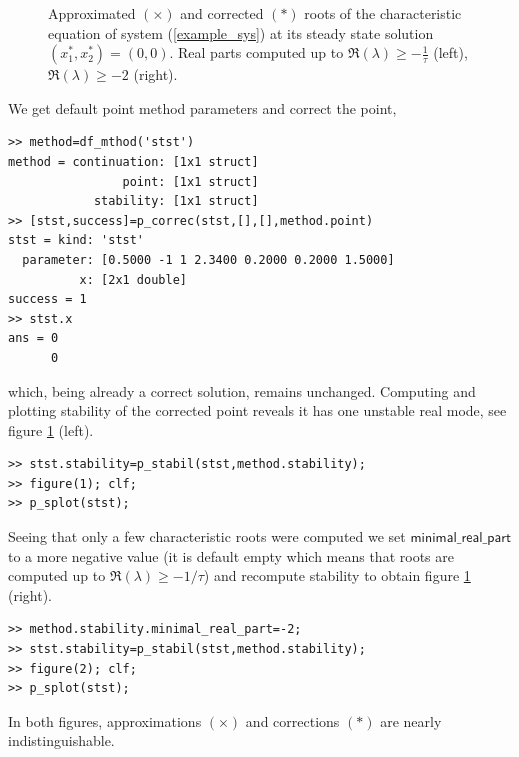 \documentclass[10pt]{article}
\gdef \parm#1{{\mathsf{#1}}}
\begin{document}
{\begin{figure}[h]
\begin{center}
\end{center}
\caption{\small\label{ride1+2_pic}Approximated $(\times)$
and corrected $(*)$ roots of the characteristic equation
of system (\ref{example_sys}) 
at its steady state solution $(x_1^*,x_2^*)=(0,0)$. 
Real parts computed up to $\Re(\lambda)\geq -\frac{1}{\tau}$
(left), $\Re(\lambda)\geq -2$ (right).} 
\end{figure}
We get default point method parameters and 
correct the point,
{\small\begin{verbatim}
>> method=df_mthod('stst')
method = continuation: [1x1 struct]
                point: [1x1 struct]
            stability: [1x1 struct]
>> [stst,success]=p_correc(stst,[],[],method.point)
stst = kind: 'stst'
  parameter: [0.5000 -1 1 2.3400 0.2000 0.2000 1.5000]
          x: [2x1 double]
success = 1
>> stst.x
ans = 0
      0
\end{verbatim}}
\noindent which, being already a correct solution, remains unchanged.
Computing and plotting stability of the corrected point reveals 
it has one unstable real mode, see figure \ref{ride1+2_pic} (left).
{\small\begin{verbatim}
>> stst.stability=p_stabil(stst,method.stability);
>> figure(1); clf;
>> p_splot(stst);
\end{verbatim}}
Seeing that only a few characteristic roots were computed we 
set $\parm{minimal\_real\_part}$ to a more
negative value (it is default empty which means that 
roots are computed up to $\Re(\lambda)\geq-1/\tau$) and recompute 
stability to obtain figure \ref{ride1+2_pic} (right).
{\small\begin{verbatim}
>> method.stability.minimal_real_part=-2;
>> stst.stability=p_stabil(stst,method.stability);
>> figure(2); clf;
>> p_splot(stst);
\end{verbatim}}
\noindent In both figures, approximations $(\times)$ and corrections $(*)$
are nearly indistinguishable.

}
\end{document}
